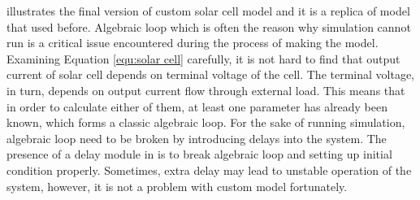  illustrates the final version of custom solar cell model and it is a replica of model that used before. Algebraic loop which is often the reason why simulation cannot run is a critical issue encountered during the process of making the model. Examining Equation \ref{equ:solar cell} carefully, it is not hard to find that output current of solar cell depends on terminal voltage of the cell. The terminal voltage, in turn, depends on output current flow through external load. This means that in order to calculate either of them, at least one parameter has already been known,  which forms a classic algebraic loop. For the sake of running simulation, algebraic loop need to be broken by introducing delays into the system. The presence of a delay module in  is to break algebraic loop and setting up initial condition properly. Sometimes, extra delay may lead to unstable operation of the system, however, it is not a problem with custom model fortunately.

